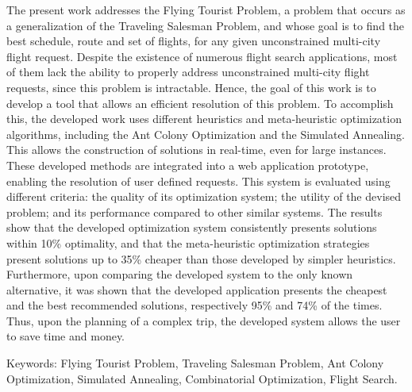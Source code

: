 The present work addresses the Flying Tourist Problem, a problem that occurs as a generalization of the Traveling Salesman Problem, and whose goal is to find the best schedule, route and set of flights, for any given unconstrained multi-city flight request. 
Despite the existence of numerous flight search applications, most of them lack the ability to properly address unconstrained multi-city flight requests, since this problem is intractable. 
Hence, the goal of this work is to develop a tool that allows an efficient resolution of this problem.
To accomplish this, the developed work uses different heuristics and meta-heuristic optimization algorithms, including the Ant Colony Optimization and the Simulated Annealing. 
This allows the construction of solutions in real-time, even for large instances. 
These developed methods are integrated into a web application prototype, enabling the resolution of user defined requests. 
This system is evaluated using different criteria: the quality of its optimization system; the utility of the devised problem; and its performance compared to other similar systems. 
The results show that the developed optimization system consistently presents solutions within 10\% optimality, and that the meta-heuristic optimization strategies present solutions up to 35\% cheaper than those developed by simpler heuristics. 
Furthermore, upon comparing the developed system to the only known alternative, it was shown that the developed application presents the cheapest and the best recommended solutions, respectively 95\% and 74\% of the times.
Thus, upon the planning of a complex trip, the developed system allows the user to save time and money.

Keywords: Flying Tourist Problem, Traveling Salesman Problem, Ant Colony Optimization, Simulated Annealing, Combinatorial Optimization, Flight Search.



